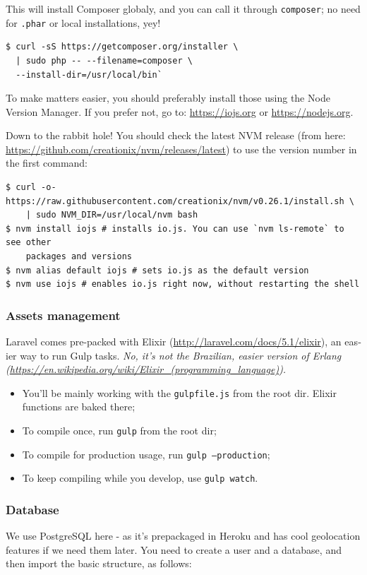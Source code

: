 \documentclass[12pt,a4paper,twoside,hyphens,english,brazil]{abntex2}
\begin{document}
{\begin{otherlanguage}{english}
This will install Composer globaly, and you can call it through \texttt{composer}; no need for \texttt{.phar} or local installations, yey!

\begin{verbatim}
$ curl -sS https://getcomposer.org/installer \
  | sudo php -- --filename=composer \
  --install-dir=/usr/local/bin`
\end{verbatim}

To make matters easier, you should preferably install those using the Node Version Manager. If you prefer not, go to: \url{https://iojs.org} or \url{https://nodejs.org}.

Down to the rabbit hole! You should check the latest NVM release (from here: \url{https://github.com/creationix/nvm/releases/latest}) to use the version number in the first command:

\begin{verbatim}
$ curl -o- https://raw.githubusercontent.com/creationix/nvm/v0.26.1/install.sh \
    | sudo NVM_DIR=/usr/local/nvm bash
$ nvm install iojs # installs io.js. You can use `nvm ls-remote` to see other
    packages and versions
$ nvm alias default iojs # sets io.js as the default version
$ nvm use iojs # enables io.js right now, without restarting the shell
\end{verbatim}

\subsubsection{Assets management}
Laravel comes pre-packed with Elixir (\url{http://laravel.com/docs/5.1/elixir}), an easier way to run Gulp tasks. \emph{No, it's not the Brazilian, easier version of Erlang (\url{https://en.wikipedia.org/wiki/Elixir_(programming_language)}).}

\begin{itemize}
	\item You'll be mainly working with the \texttt{gulpfile.js} from the root dir. Elixir functions are baked there;
	\item To compile once, run \texttt{gulp} from the root dir;
	\item To compile for production usage, run \texttt{gulp --production};
	\item To keep compiling while you develop, use \texttt{gulp watch}.
\end{itemize}

\subsubsection{Database}
We use PostgreSQL here - as it's prepackaged in Heroku and has cool geolocation features if we need them later. You need to create a user and a database, and then import the basic structure, as follows:


\end{otherlanguage}}
\end{document}
